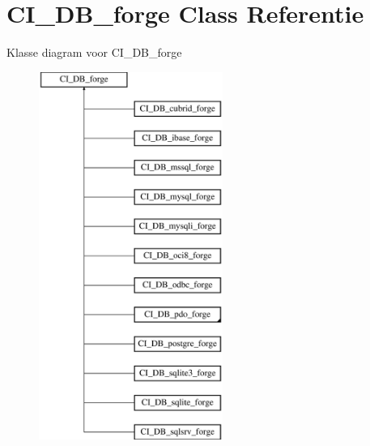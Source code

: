 \hypertarget{class_c_i___d_b__forge}{}\section{C\+I\+\_\+\+D\+B\+\_\+forge Class Referentie}
\label{class_c_i___d_b__forge}
Klasse diagram voor C\+I\+\_\+\+D\+B\+\_\+forge\begin{figure}[H]
\begin{center}
\leavevmode
\includegraphics[height=12.000000cm]{class_c_i___d_b__forge}
\end{center}
\end{figure}
